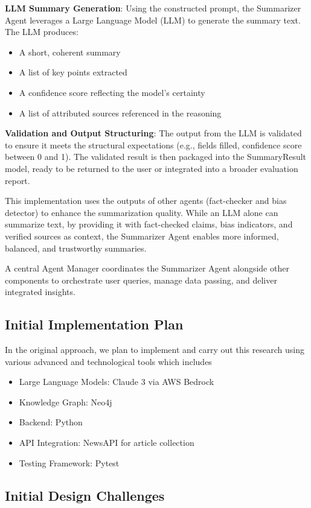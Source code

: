 \documentclass{scrartcl}
\begin{document}
\textbf{LLM Summary Generation}: Using the constructed prompt, the Summarizer Agent leverages a Large Language Model (LLM) to generate the summary text. The LLM produces:
\begin{itemize}
    \item A short, coherent summary
    \item A list of key points extracted
    \item A confidence score reflecting the model’s certainty
    \item A list of attributed sources referenced in the reasoning

\end{itemize}

\textbf{Validation and Output Structuring}: The output from the LLM is validated to ensure it meets the structural expectations (e.g., fields filled, confidence score between 0 and 1). The validated result is then packaged into the SummaryResult model, ready to be returned to the user or integrated into a broader evaluation report.

This implementation uses the outputs of other agents (fact-checker and bias detector) to enhance the summarization quality. While an LLM alone can summarize text, by providing it with fact-checked claims, bias indicators, and verified sources as context, the Summarizer Agent enables more informed, balanced, and trustworthy summaries.

A central Agent Manager coordinates the Summarizer Agent alongside other components to orchestrate user queries, manage data passing, and deliver integrated insights.

\subsection{Initial Implementation Plan}
In the original approach, we plan to implement and carry out this research using various advanced and technological tools which includes 
\begin{itemize}
    \item Large Language Models: Claude 3 via AWS Bedrock
    \item Knowledge Graph: Neo4j
    \item Backend: Python
    \item API Integration: NewsAPI for article collection
    \item Testing Framework: Pytest
\end{itemize}

\subsection{Initial Design Challenges}
\end{document}
